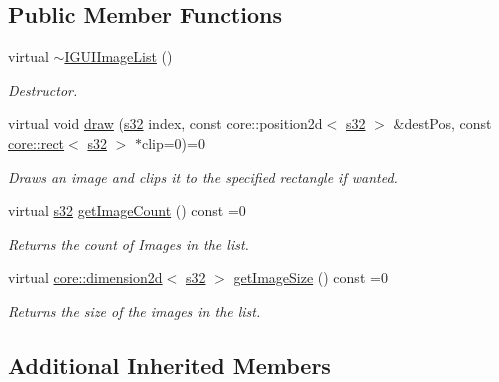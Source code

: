 \subsection*{Public Member Functions}
\begin{DoxyCompactItemize}
\item 
\mbox{\label{classirr_1_1gui_1_1IGUIImageList_ad6be754893f7ba902d821d215761075f}} 
virtual \hyperlink{classirr_1_1gui_1_1IGUIImageList_ad6be754893f7ba902d821d215761075f}{$\sim$\+I\+G\+U\+I\+Image\+List} ()
\begin{DoxyCompactList}\small\item\em Destructor. \end{DoxyCompactList}\item 
virtual void \hyperlink{classirr_1_1gui_1_1IGUIImageList_ae19fa00cece01c5914dfc0a3e33a882c}{draw} (\hyperlink{namespaceirr_ac66849b7a6ed16e30ebede579f9b47c6}{s32} index, const core\+::position2d$<$ \hyperlink{namespaceirr_ac66849b7a6ed16e30ebede579f9b47c6}{s32} $>$ \&dest\+Pos, const \hyperlink{classirr_1_1core_1_1rect}{core\+::rect}$<$ \hyperlink{namespaceirr_ac66849b7a6ed16e30ebede579f9b47c6}{s32} $>$ $\ast$clip=0)=0
\begin{DoxyCompactList}\small\item\em Draws an image and clips it to the specified rectangle if wanted. \end{DoxyCompactList}\item 
virtual \hyperlink{namespaceirr_ac66849b7a6ed16e30ebede579f9b47c6}{s32} \hyperlink{classirr_1_1gui_1_1IGUIImageList_a1cc8626cacd608f343d103394423753e}{get\+Image\+Count} () const =0
\begin{DoxyCompactList}\small\item\em Returns the count of Images in the list. \end{DoxyCompactList}\item 
virtual \hyperlink{classirr_1_1core_1_1dimension2d}{core\+::dimension2d}$<$ \hyperlink{namespaceirr_ac66849b7a6ed16e30ebede579f9b47c6}{s32} $>$ \hyperlink{classirr_1_1gui_1_1IGUIImageList_a5973353355625da76b24100f16f90539}{get\+Image\+Size} () const =0
\begin{DoxyCompactList}\small\item\em Returns the size of the images in the list. \end{DoxyCompactList}\end{DoxyCompactItemize}
\subsection*{Additional Inherited Members}


